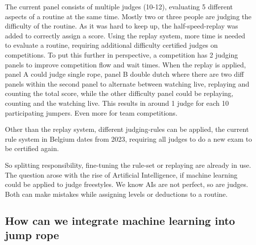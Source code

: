 The current panel consists of multiple judges (10-12), evaluating 5 different aspects of a routine at the same time. Mostly two or three people are judging the difficulty of the routine. As it was hard to keep up, the half-speed-replay was added to correctly assign a score.
Using the replay system, more time is needed to evaluate a routine, requiring additional difficulty certified judges on competitions. To put this further in perspective, a competition has 2 judging panels to improve competition flow and wait times. When the replay is applied, panel A could judge single rope, panel B double dutch where there are two diff panels within the second panel to alternate between watching live, replaying and counting the total score, while the other difficulty panel could be replaying, counting and the watching live. This results in around 1 judge for each 10 participating jumpers. Even more for team competitions.

Other than the replay system, different judging-rules can be applied, the current rule system in Belgium dates from 2023, requiring all judges to do a new exam to be certified again.

So splitting responsibility, fine-tuning the rule-set or replaying are already in use. The question arose with the rise of Artificial Intelligence, if machine learning could be applied to judge freestyles. We know AIs are not perfect, so are judges. Both can make mistakes while assigning levels or deductions to a routine.



\subsection{How can we integrate machine learning into jump rope}


